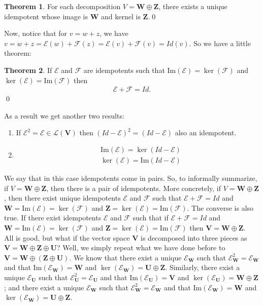 \documentclass{article}
\theoremstyle{definition}
\newtheorem{thm}{Theorem}[section]
\newcommand{\F}{\mathcal{F}}
\newcommand{\V}{\mathbf{V}}
\newcommand{\W}{\mathbf{W}}
\newcommand{\Z}{\mathbf{Z}}
\newcommand{\U}{\mathbf{U}}
\newcommand{\lag}{\mathcal{L}}
\newcommand{\E}{\mathcal{E}}
\newcommand{\ima}{\text{Im}}
\begin{document}
\begin{thm}
	For each decomposition $V = \W \oplus \Z$, there exists a unique idempotent whose image is $\W$ and kernel is $\Z$.\qed
\end{thm}

Now, notice that for $v = w + z$, we have $v = w + z = \E(w) + \F(z) = \E(v) + \F(v) = Id(v)$. So we have a little theorem:

\begin{thm}
	If $\E$ and $\F$ are idempotents such that $\ima(\E) = \ker(\F)$ and $\ker(\E) = \ima(\F)$ then
	\begin{align*}
	\E + \F = Id. 
	\end{align*}\qed
\end{thm} 

As a result we get another two results:

	\begin{enumerate}
		\item If $\E^2 = \E \in \lag(\V)$ then $(Id - \E)^2 = (Id - \E)$ also an idempotent.
		
		\item 
		\begin{align*}
		&\ima(\E) = \ker(Id - \E)\\
		&\ker(\E) = \ima(Id - \E)
		\end{align*}
	\end{enumerate}

We say that in this case idempotents come in pairs. So, to informally summarize, if $V = \W \oplus \Z$, then there is a pair of idempotents. More concretely, if $V = \W \oplus \Z$, then there exist unique idempotents $\E$ and $\F$ such that $\E + \F = Id$ and $\W = \ima(\E) = \ker(\F)$ and $\Z = \ker(\E) = \ima(\F)$. The converse is also true. If there exist idempotents $\E$ and $\F$ such that if $\E + \F = Id$ and $\W = \ima(\E) = \ker(\F)$ and $\Z = \ker(\E) = \ima(\F)$ then $\V = \W \oplus \Z$.\\

All is good, but what if the vector space $\V$ is decomposed into three pieces as $\V = \W \oplus \Z \oplus \U$? Well, we simply repeat what we have done before to $\V = \W \oplus (\Z \oplus \U)$. We know that there exist a unique $\E_\W$ such that $\E_\W^2 = \E_\W$ and that $\ima(\E_\W) = \W$ and $\ker(\E_\W) = \U\oplus \Z$. Similarly,  there exist a unique $\E_\U$ such that $\E_\U^2 = \E_\U$ and that $\ima(\E_\U) = \V$ and $\ker(\E_\U) = \W\oplus \Z$; and there exist a unique $\E_\W$ such that $\E_\W^2 = \E_\W$ and that $\ima(\E_\W) = \W$ and $\ker(\E_\W) = \U\oplus \Z$.\\
\end{document}
